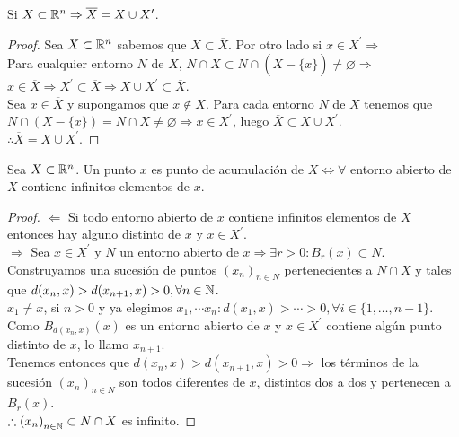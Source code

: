 \begin{prop}
  Si \(X \subset \mathbb{R}^n \Rightarrow \overline{X} = X \cup X^{\prime} \).
  \begin{proof}
    Sea \(X \subset \mathbb{R}^n\) sabemos que \(X \subset \overline{X} \). Por otro lado si \(x \in X^{\prime} \Rightarrow \) \\
    Para cualquier entorno \(N\) de \(X\), \(N \cap X \subset N \cap (\overline{X - \{x\}}) \neq \varnothing \Rightarrow \) \\
    \(x \in \overline{X} \Rightarrow X^{\prime} \subset \overline{X} \Rightarrow X \cup X^{\prime} \subset \overline{X} \). \\

    Sea \(x \in \overline{X} \) y supongamos que \(x \notin X\). Para cada entorno \(N\) de \(X\) tenemos que \(N \cap (X - \{x\}) = N \cap X \neq \varnothing \Rightarrow x \in X^{\prime} \), luego \(\overline{X} \subset X \cup X^{\prime} \). \\
    \(\therefore \overline{X} = X \cup X^{\prime} \).
  \end{proof}
\end{prop}

\clearpage

\begin{prop}
  Sea \(X \subset \mathbb{R}^n\). Un punto \(x\) es punto de acumulación de \(X \iff \forall \) entorno abierto de \(X\) contiene infinitos elementos de \(x\).

  \begin{proof}
    \(\Leftarrow \) Si todo entorno abierto de \(x\) contiene infinitos elementos de \(X\) entonces hay alguno distinto de \(x\) y \(x \in X^{\prime} \). \\
    \(\Rightarrow \) Sea \(x \in X^{\prime} \) y \(N\) un entorno abierto de \(x \Rightarrow \exists r > 0 : B_r(x) \subset N\). \\
    Construyamos una sucesión de puntos \({(x_n)}_{n \in N} \) pertenecientes a \(N \cap X\) y tales que \(d(x_n, x) > d(x_{n+1}, x) > 0, \forall n \in \mathbb{N} \). \\
    \(x_1 \neq x\), si \(n > 0\) y ya elegimos \(x_1, \cdots x_n : d(x_1, x) > \cdots > 0, \forall i \in \{1, \ldots, n-1\} \). Como \(B_{d(x_n, x)}(x)\) es un entorno abierto de \(x\) y \(x \in X^{\prime} \) contiene algún punto distinto de \(x\), lo llamo \(x_{n+1} \). \\
    Tenemos entonces que \(d(x_n, x) > d(x_{n+1}, x) > 0 \Rightarrow \) los términos de la sucesión \({(x_n)}_{n \in N} \) son todos diferentes de \(x\), distintos dos a dos y pertenecen a \(B_r(x)\). \\
    \(\therefore {(x_n)}_{n \in \mathbb{N}} \subset N \cap X\) es infinito.
  \end{proof}
\end{prop}

